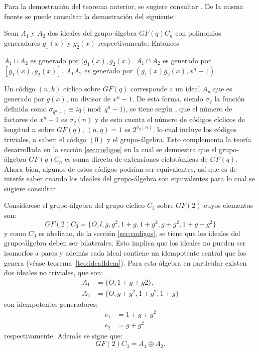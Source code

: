Para la demostración del  teorema anterior, se sugiere consultar \cite[52]{bib:codeBook}. De la misma fuente se puede consultar la demostración del siguiente:
\begin{teorema}
Sean $A_1$ y $A_2$ dos ideales del grupo-álgebra $GF(q)C_n$ con polinomios generadores $g_1(x)$ y $g_2(x)$ respectivamente. Entonces
\begin{bulletList}
\newItem $A_1 \cup A_2$ es generado por $(g_1(x),g_2(x)$.
\newItem $A_1 \cap A_2$ es generado por $[g_1(x),g_2(x)]$.
\newItem $A_1A_2$ es generado por $(g_1(x)g_2(x),x^n-1)$.
\end{bulletList}
\end{teorema}
Un código $(n,k)$ cíclico sobre $GF(q)$ corresponde a un ideal $A_n$ que es generado por $g(x)$, un divisor de $x^n-1$. De esta forma, siendo $\sigma_q$ la función definida como $\sigma_{q^n-1} \equiv iq \pmod{q^n-1}$, se tiene según \cite[ 31]{bib:codeBook}, que el número de factores de $x^n-1$ es $\sigma_q(n)$ y de esta cuenta el número de códigos cíclicos de longitud $n$ sobre $GF(q)$,  $(n,q)=1$ es $2^{\sigma_q(n)}$, lo cual incluye los códigos triviales, a saber: el código $(0)$ y el grupo-álgebra. Esto complementa la teoría desarrollada en la sección \ref{sec:codigos} en la cual se demuestra que el grupo-álgebra $GF(q)C_n$ es suma directa de extensiones ciclotómicas de $GF(q)$.
Ahora bien, algunos de estos códigos podrían ser equivalentes, así que es de interés saber cuando los ideales del grupo-álgebra son equivalentes para lo cual se sugiere consultar \cite[43-45]{bib:codeBook} 
\newpage
\begin{ejemplo}
Considérese el grupo-álgebra del grupo cíclico $C_3$ sobre $GF(2)$ cuyos elementos son:\[ GF(2)C_3 = \{O, l,g,g^2, 1 +g, 1 +g^2,g+g^2, 1 +g+g^2\} \]
y como $C_3$ es abeliano, de la sección \ref{sec:codigos}, se tiene que los ideales del grupo-álgebra deben ser bilaterales. Esto implica que los ideales no pueden ser isomorfos a pares y además cada ideal contiene un idempotente central que los genera (véase teorema~\ref{teo:idealIdem}). Para esta álgebra en particular existen dos ideales no triviales, que son:
\begin{align*}
A_1 &= \{O, 1 + g + g2\}, \\
A_2 &=\{O,g+g^2, 1 +g^2, 1 +g\}
\end{align*}
con idempotentes generadores:
\begin{align*}
e_1 &= 1 + g + g^2\\
 e_2 &= g + g^2
\end{align*}
respectivamente. Además se sigue que: \[ GF(2)C_3 = A_1 \oplus A_2.\]
\end{ejemplo} 




